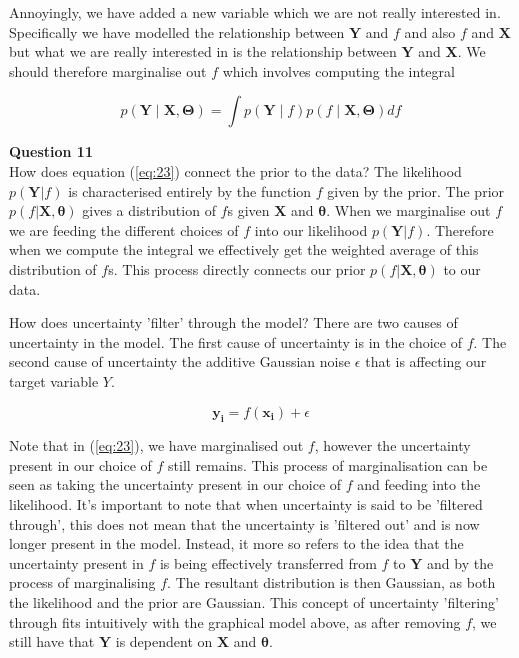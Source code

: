 \documentclass[10pt, a4paper, twocolumn]{article} %
\begin{document}
\begin{enumerate}
  Annoyingly, we have added a new variable which we are not really interested in. Specifically we have modelled the relationship between $\mathbf{Y}$ and $f$ and also $f$ and $\mathbf{X}$ but what we are really interested in is the relationship between $\mathbf{Y}$ and $\mathbf{X}$. We should therefore marginalise out $f$ which involves computing the integral
  
  \begin{equation} \label{eq:23}
      p(\mathbf{Y}\mid \mathbf{X},\mathbf{\Theta}) = \int p(\mathbf{Y}\mid f)p(f\mid \mathbf{X},\mathbf{\Theta})df 
  \end{equation}
  
  \textbf{Question 11}\\
  How does equation (\ref{eq:23}) connect the prior to the data? The likelihood $p(\mathbf{Y}|f)$ is characterised entirely by the function $f$ given by the prior. The prior $p(f|\mathbf{X},\mathbf{\theta})$ gives a distribution of $f$s given $\mathbf{X}$ and $\mathbf{\theta}$. When we marginalise out $f$ we are feeding the different choices of $f$ into our likelihood $p(\mathbf{Y}|f)$. Therefore when we compute the integral we effectively get the weighted average of this distribution of $f$s. This process directly connects our prior $p(f|\mathbf{X},\mathbf{\theta})$ to our data. 
  
  How does uncertainty 'filter' through the model?
  There are two causes of uncertainty in the model. The first cause of uncertainty is in the choice of $f$. The second cause of uncertainty the additive Gaussian noise $\epsilon$ that is affecting our target variable $Y$.
  
  \begin{equation}
      \mathbf{y_i} = f(\mathbf{x_i}) + \epsilon
  \end{equation}
  
  Note that in (\ref{eq:23}), we have marginalised out $f$, however the uncertainty present in our choice of $f$ still remains. This process of marginalisation can be seen as taking the uncertainty present in our choice of $f$ and feeding into the likelihood. It's important to note that when uncertainty is said to be 'filtered through', this does not mean that the uncertainty is 'filtered out' and is now longer present in the model. Instead, it more so refers to the idea that the uncertainty present in $f$ is being effectively transferred from $f$ to $\mathbf{Y}$ and by the process of marginalising $f$. The resultant distribution is then Gaussian, as both the likelihood and the prior are Gaussian. This concept of uncertainty 'filtering' through fits intuitively with the graphical model above, as after removing $f$, we still have that $\mathbf{Y}$ is dependent on $\mathbf{X}$ and $\mathbf{\theta}$.
  

\end{enumerate}
\end{document}
